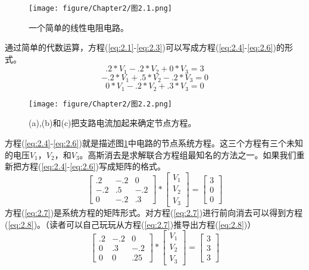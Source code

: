 \begin{figure}[htbp]
\small
    \centering
    \texttt{[image: figure/Chapter2/图2.1.png]}
    \caption{一个简单的线性电阻电路。}
    \label{图2.1}
\end{figure}

通过简单的代数运算，方程(\ref{eq:2.1}-\ref{eq:2.3})可以写成方程(\ref{eq:2.4}-\ref{eq:2.6})的形式。
\begin{equation}
    .2*V_1-.2*V_2+0*V_3=3
    \label{eq:2.4}
\end{equation}
\begin{equation}
    -.2*V_1+.5*V_2-.2*V_3=0
    \label{eq:2.5}
\end{equation}
\begin{equation}
     0*V_1-.2*V_2+.3*V_3=0
    \label{eq:2.6}
\end{equation}
\begin{figure}[htbp]
\small
    \centering
    \texttt{[image: figure/Chapter2/图2.2.png]}
    \caption{(a),(b)和(c)把支路电流加起来确定节点方程。}
    \label{图2.2}
\end{figure}
方程(\ref{eq:2.4}-\ref{eq:2.6})就是描述图\ref{图2.1}中电路的节点系统方程。这三个方程有三个未知的电压$V_1$，$V_2$，和$V_3$。高斯消去是求解联合方程组最知名的方法之一。如果我们重新把方程(\ref{eq:2.4}-\ref{eq:2.6})写成矩阵的格式。
\begin{equation}
\begin{bmatrix}
.2&  -.2&0 \\ 
 -.2&  .5&-.2 \\ 
 0&  -.2&.3
\end{bmatrix}*\begin{bmatrix}
V_1\\ 
V_2\\ 
V_3
\end{bmatrix}=\begin{bmatrix}
3\\ 
0\\ 
0
\end{bmatrix}
\label{eq:2.7}
\end{equation}
方程(\ref{eq:2.7})是系统方程的矩阵形式。对方程(\ref{eq:2.7})进行前向消去可以得到方程(\ref{eq:2.8})。（读者可以自己玩玩从方程(\ref{eq:2.7})推导出方程(\ref{eq:2.8})）
\begin{equation}
    \begin{bmatrix}
.2&  -.2&0 \\ 
 0&  .3&-.2 \\ 
 0&  0&.25
\end{bmatrix}*\begin{bmatrix}
V_1\\ 
V_2\\ 
V_3
\end{bmatrix}=\begin{bmatrix}
3\\ 
3\\ 
3
\end{bmatrix}
\label{eq:2.8}
\end{equation}
